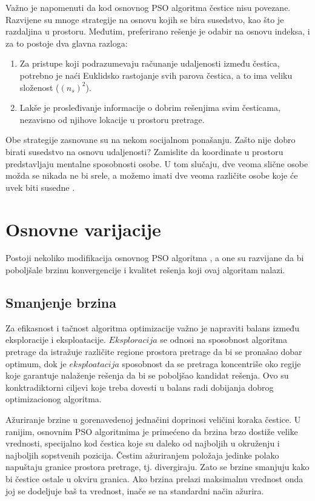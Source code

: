 \documentclass[a4paper]{article}
\begin{document}
Važno je napomenuti da kod osnovnog PSO algoritma čestice nisu povezane. Razvijene su mnoge strategije na osnovu kojih se bira susedstvo, kao što je razdaljina u prostoru. Međutim, preferirano rešenje je odabir na osnovu indeksa, i za to postoje dva glavna razloga:
\begin{enumerate}
    \item Za pristupe koji podrazumevaju računanje udaljenosti između čestica, potrebno je naći Euklidsko rastojanje svih parova čestica, a to ima veliku složenost ($(n_s)^2$).
    \item Lakše je prosleđivanje informacije o dobrim rešenjima svim česticama, nezavisno od njihove lokacije u prostoru pretrage.

\end{enumerate}
Obe strategije zasnovane su na nekom socijalnom ponašanju. Zašto nije dobro birati susedstvo na osnovu udaljenosti? Zamislite da koordinate u prostoru predstavljaju mentalne sposobnosti osobe. U tom slučaju, dve veoma slične osobe možda se nikada ne bi srele, a možemo imati dve veoma različite osobe koje će uvek biti susedne \cite{liu2006particle}.
    
\section{Osnovne varijacije}
Postoji nekoliko modifikacija osnovnog PSO algoritma \cite{rini2011particle}, a one su razvijane da bi poboljšale brzinu konvergencije i kvalitet rešenja koji ovaj algoritam nalazi.

\subsection{Smanjenje brzina}
Za efikasnost i tačnost algoritma optimizacije važno je napraviti balans između eksploracije i eksploatacije. 
$Eksploracija$ se odnosi na sposobnost algoritma pretrage da istražuje različite regione prostora pretrage da bi se pronašao dobar optimum, dok je $eksploatacija$ sposobnost  da se pretraga koncentriše oko regije koje garantuje nalaženje rešenja da bi se poboljšao kandidat rešenja. Ovo su konktradiktorni ciljevi koje treba dovesti u balans radi dobijanja dobrog optimizacionog algoritma.

Ažuriranje brzine u gorenavedenoj jednačini doprinosi veličini koraka čestice. U ranijim, osnovnim PSO algoritmima je primećeno da brzina brzo dostiže velike vrednosti, specijalno kod čestica koje su daleko od najboljih u okruženju i najboljih sopstvenih pozicija. Čestim ažuriranjem položaja jedinke polako napuštaju granice prostora pretrage, tj. divergiraju. Zato se brzine smanjuju kako bi čestice ostale u okviru granica. Ako brzina prelazi maksimalnu vrednost onda joj se dodeljuje baš ta vrednost, inače se na standardni način ažurira.
\end{document}
